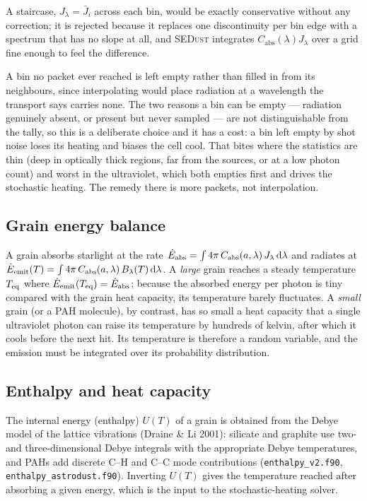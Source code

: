 \documentclass[english,a4paper]{kiseon_memo}
\newcommand{\Cabs}{C_{\mathrm{abs}}}
\newcommand{\Jlam}{J_\lambda}
\newcommand{\dd}{\mathrm{d}}
\newcommand{\file}[1]{\texttt{#1}}
\begin{document}
A staircase, $\Jlam=\bar J_i$ across each bin, would be exactly conservative
without any correction; it is rejected because it replaces one discontinuity per
bin edge with a spectrum that has no slope at all, and \textsc{SEDust} integrates
$\Cabs(\lambda)\Jlam$ over a grid fine enough to feel the difference.

A bin no packet ever reached is left empty rather than filled in from its
neighbours, since interpolating would place radiation at a wavelength the
transport says carries none.  The two reasons a bin can be empty --- radiation
genuinely absent, or present but never sampled --- are not distinguishable from
the tally, so this is a deliberate choice and it has a cost: a bin left empty by
shot noise loses its heating and biases the cell cool.  That bites where the
statistics are thin (deep in optically thick regions, far from the sources, or at
a low photon count) and worst in the ultraviolet, which both empties first and
drives the stochastic heating.  The remedy there is more packets, not
interpolation.

\subsection{Grain energy balance}
A grain absorbs starlight at the rate
$\dot E_{\rm abs}=\int 4\pi\,\Cabs(a,\lambda)\,\Jlam\,\dd\lambda$ and radiates at
$\dot E_{\rm emit}(T)=\int 4\pi\,\Cabs(a,\lambda)\,B_\lambda(T)\,\dd\lambda$.  A
\emph{large} grain reaches a steady temperature $T_{\rm eq}$ where
$\dot E_{\rm emit}(T_{\rm eq})=\dot E_{\rm abs}$; because the absorbed energy per
photon is tiny compared with the grain heat capacity, its temperature barely
fluctuates.  A \emph{small} grain (or a PAH molecule), by contrast, has so small
a heat capacity that a single ultraviolet photon can raise its temperature by
hundreds of kelvin, after which it cools before the next hit.  Its temperature
is therefore a random variable, and the emission must be integrated over its
probability distribution.

\subsection{Enthalpy and heat capacity}
The internal energy (enthalpy) $U(T)$ of a grain is obtained from the Debye
model of the lattice vibrations (Draine \& Li 2001): silicate and graphite use
two- and three-dimensional Debye integrals with the appropriate Debye
temperatures, and PAHs add discrete C--H and C--C mode contributions
(\file{enthalpy\_v2.f90}, \file{enthalpy\_astrodust.f90}).  Inverting $U(T)$
gives the temperature reached after absorbing a given energy, which is the input
to the stochastic-heating solver.
\end{document}
